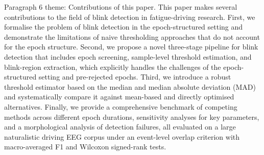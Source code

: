 
Paragraph 6 theme: Contributions of this paper.
This paper makes several contributions to the field of blink detection in fatigue-driving research. First, we formalise the problem of blink detection in the epoch-structured setting and demonstrate the limitations of naive thresholding approaches that do not account for the epoch structure. Second, we propose a novel three-stage pipeline for blink detection that includes epoch screening, sample-level threshold estimation, and blink-region extraction, which explicitly handles the challenges of the epoch-structured setting and pre-rejected epochs. Third, we introduce a robust threshold estimator based on the median and median absolute deviation (MAD) and systematically compare it against mean-based and directly optimised alternatives. Finally, we provide a comprehensive benchmark of competing methods across different epoch durations, sensitivity analyses for key parameters, and a morphological analysis of detection failures, all evaluated on a large naturalistic driving EEG corpus under an event-level overlap criterion with macro-averaged F1 and Wilcoxon signed-rank tests.